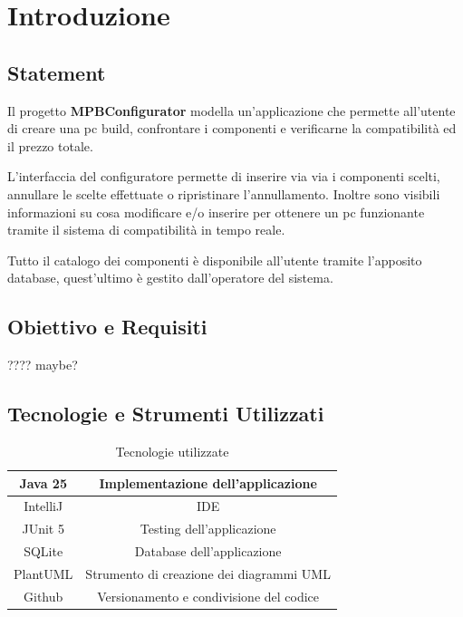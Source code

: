 \documentclass[12pt,a4paper]{article}
\begin{document}
\section{Introduzione}
\subsection{Statement}
Il progetto \textbf{MPBConfigurator} modella un'applicazione che permette all'utente di creare una pc build, confrontare i componenti e verificarne la compatibilità ed il prezzo totale.

L'interfaccia del configuratore permette di inserire via via i componenti scelti, annullare le scelte effettuate o ripristinare l'annullamento. Inoltre sono visibili informazioni su cosa modificare e/o inserire per ottenere un pc funzionante tramite il sistema di compatibilità in tempo reale.

Tutto il catalogo dei componenti è disponibile all'utente tramite l'apposito database, quest'ultimo è gestito dall'operatore del sistema.

\subsection{Obiettivo e Requisiti}
???? maybe?

\subsection{Tecnologie e Strumenti Utilizzati}

\begin{table}[H]
    \centering
    \begin{tabular}{|c|c|}
    \hline
        Java 25 &  Implementazione dell'applicazione \\
        \hline
        IntelliJ & IDE \\
        \hline
        JUnit 5 &  Testing dell'applicazione \\
        \hline
        SQLite  &  Database dell'applicazione\\
        \hline
        PlantUML & Strumento di creazione dei diagrammi UML \\
        \hline
        Github & Versionamento e condivisione del codice\\
        \hline
    \end{tabular}
    \caption{Tecnologie utilizzate}
    \label{tab:placeholder}
\end{table}
\end{document}
